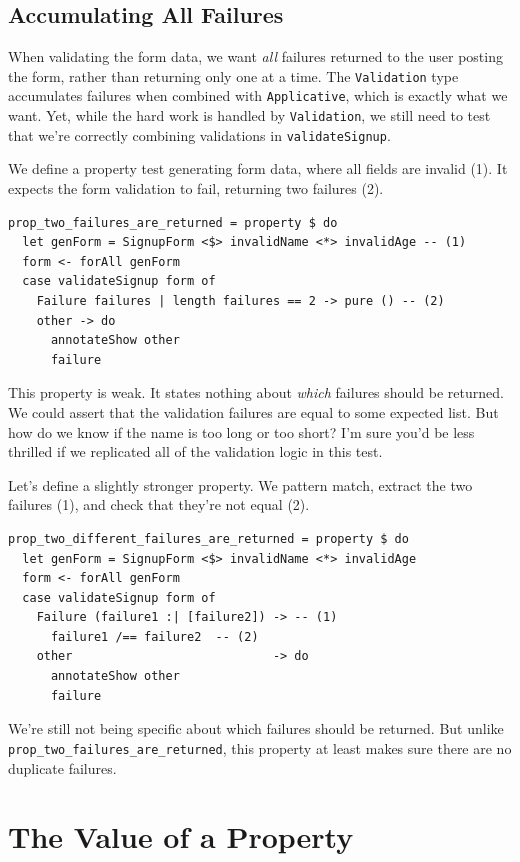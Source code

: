 \subsection{Accumulating All
Failures}\label{accumulating-all-failures}

When validating the form data, we want \emph{all} failures returned to
the user posting the form, rather than returning only one at a time. The
\texttt{Validation} type accumulates failures when combined with
\texttt{Applicative}, which is exactly what we want. Yet, while the hard
work is handled by \texttt{Validation}, we still need to test that we're
correctly combining validations in \texttt{validateSignup}.

We define a property test generating form data, where all fields are
invalid (1). It expects the form validation to fail, returning two
failures (2).

\begin{verbatim}
prop_two_failures_are_returned = property $ do
  let genForm = SignupForm <$> invalidName <*> invalidAge -- (1)
  form <- forAll genForm
  case validateSignup form of
    Failure failures | length failures == 2 -> pure () -- (2)
    other -> do
      annotateShow other
      failure
\end{verbatim}
This property is weak. It states nothing about \emph{which} failures
should be returned. We could assert that the validation failures are
equal to some expected list. But how do we know if the name is too long
or too short? I'm sure you'd be less thrilled if we replicated all of
the validation logic in this test.

Let's define a slightly stronger property. We pattern match, extract the
two failures (1), and check that they're not equal (2).

\begin{verbatim}
prop_two_different_failures_are_returned = property $ do
  let genForm = SignupForm <$> invalidName <*> invalidAge
  form <- forAll genForm
  case validateSignup form of
    Failure (failure1 :| [failure2]) -> -- (1)
      failure1 /== failure2  -- (2)
    other                            -> do
      annotateShow other
      failure
\end{verbatim}
We're still not being specific about which failures should be returned.
But unlike \texttt{prop\_two\_failures\_\-are\_\-returned}, this property at
least makes sure there are no duplicate failures.

\section{The Value of a Property}\label{the-value-of-a-property}

